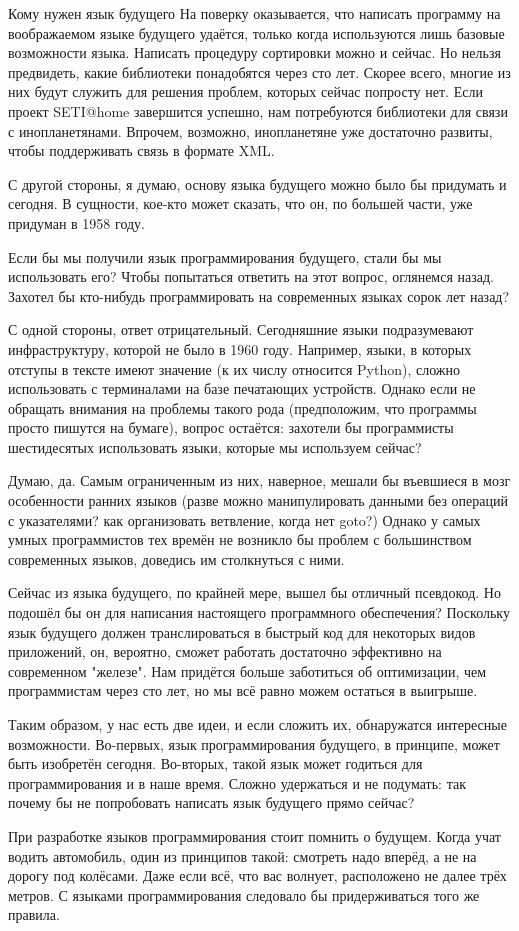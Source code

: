 \documentclass[ebook,12pt,oneside,openany]{memoir}
\begin{document}
Кому нужен язык будущего На поверку оказывается, что написать
программу на воображаемом языке будущего удаётся, только когда
используются лишь базовые возможности языка. Написать процедуру
сортировки можно и сейчас. Но нельзя предвидеть, какие библиотеки
понадобятся через сто лет. Скорее всего, многие из них будут служить
для решения проблем, которых сейчас попросту нет. Если проект
SETI@home завершится успешно, нам потребуются библиотеки для связи с
инопланетянами. Впрочем, возможно, инопланетяне уже достаточно
развиты, чтобы поддерживать связь в формате XML.

С другой стороны, я думаю, основу языка будущего можно было бы
придумать и сегодня. В сущности, кое-кто может сказать, что он, по
большей части, уже придуман в 1958 году.

Если бы мы получили язык программирования будущего, стали бы мы
использовать его? Чтобы попытаться ответить на этот вопрос, оглянемся
назад. Захотел бы кто-нибудь программировать на современных языках
сорок лет назад?

С одной стороны, ответ отрицательный. Сегодняшние языки подразумевают
инфраструктуру, которой не было в 1960 году. Например, языки, в
которых отступы в тексте имеют значение (к их числу относится Python),
сложно использовать с терминалами на базе печатающих устройств. Однако
если не обращать внимания на проблемы такого рода (предположим, что
программы просто пишутся на бумаге), вопрос остаётся: захотели бы
программисты шестидесятых использовать языки, которые мы используем
сейчас?

Думаю, да. Самым ограниченным из них, наверное, мешали бы въевшиеся в
мозг особенности ранних языков (разве можно манипулировать данными без
операций с указателями? как организовать ветвление, когда нет goto?)
Однако у самых умных программистов тех времён не возникло бы проблем с
большинством современных языков, доведись им столкнуться с ними.

Сейчас из языка будущего, по крайней мере, вышел бы отличный
псевдокод. Но подошёл бы он для написания настоящего программного
обеспечения? Поскольку язык будущего должен транслироваться в быстрый
код для некоторых видов приложений, он, вероятно, сможет работать
достаточно эффективно на современном "железе". Нам придётся больше
заботиться об оптимизации, чем программистам через сто лет, но мы всё
равно можем остаться в выигрыше.

Таким образом, у нас есть две идеи, и если сложить их, обнаружатся
интересные возможности. Во-первых, язык программирования будущего, в
принципе, может быть изобретён сегодня. Во-вторых, такой язык может
годиться для программирования и в наше время. Сложно удержаться и не
подумать: так почему бы не попробовать написать язык будущего прямо
сейчас?

При разработке языков программирования стоит помнить о будущем. Когда
учат водить автомобиль, один из принципов такой: смотреть надо вперёд,
а не на дорогу под колёсами. Даже если всё, что вас волнует,
расположено не далее трёх метров. С языками программирования следовало
бы придерживаться того же правила.
\end{document}
